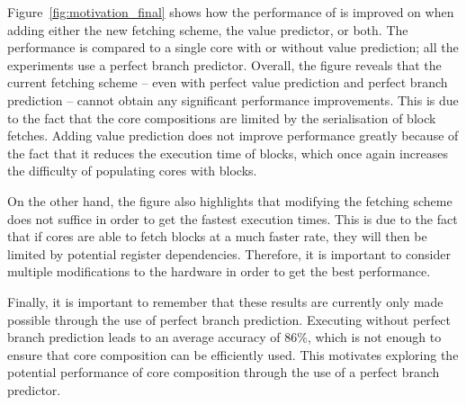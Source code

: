 Figure~\ref{fig:motivation_final} shows how the performance of  is improved on when adding either the new fetching scheme, the value predictor, or both.
The performance is compared to a single core with or without value prediction; all the experiments use a perfect branch predictor.
Overall, the figure reveals that the current fetching scheme -- even with perfect value prediction and perfect branch prediction -- cannot obtain any significant performance improvements.
This is due to the fact that the core compositions are limited by the serialisation of block fetches.
Adding value prediction does not improve performance greatly because of the fact that it reduces the execution time of blocks, which once again increases the difficulty of populating cores with blocks.

On the other hand, the figure also highlights that modifying the fetching scheme does not suffice in order to get the fastest execution times.
This is due to the fact that if cores are able to fetch blocks at a much faster rate, they will then be limited by potential register dependencies.
Therefore, it is important to consider multiple modifications to the hardware in order to get the best performance.

Finally, it is important to remember that these results are currently only made possible through the use of perfect branch prediction.
Executing  without perfect branch prediction leads to an average accuracy of 86\%, which is not enough to ensure that core composition can be efficiently used.
This motivates exploring the potential performance of core composition through the use of a perfect branch predictor.
